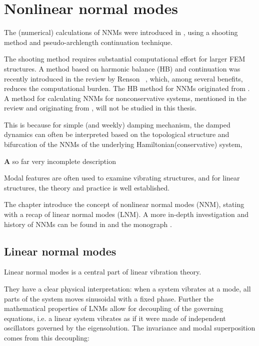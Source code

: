 
\section{Nonlinear normal modes}
\label{sec:nonl-norm-modes}

The (numerical) calculations of NNMs were introduced in
\textcite{kerschen2009b}, using a shooting method and pseudo-archlength
continuation technique.

The shooting method requires substantial computational effort for larger FEM
structures. A method based on harmonic balance (HB) and continuation was
recently introduced in the review by Renson~ \autocite{renson2016a}, which, among several
benefits, reduces the computational burden. The HB method for NNMs originated
from \textcite{detroux2016a}. A method for calculating NNMs for nonconservative
systems, mentioned in the review and originating from \textcite{renson2014_phd},
will not be studied in this thesis.

This is because for simple (and weekly) damping mechanism, the damped dynamics
can often be interpreted based on the topological structure and bifurcation of
the NNMs of the underlying Hamiltonian(conservative) system,
\autocite[sec. 4]{renson2016a}

{\textbf A so far very incomplete description}

Modal features are often used to examine vibrating structures, and for linear
structures, the theory and practice is well established.

The chapter introduce the concept of nonlinear normal modes (NNM), stating with
a recap of linear normal modes (LNM). A more in-depth investigation and history
of NNMs can be found in \autocite{kerschen2009a} and the monograph \autocite[chap
2.]{vakakis2008a}.


\subsection{Linear normal modes}
\label{sec:linear-normal-modes}


Linear normal modes is a central part of linear vibration theory.

They have a clear physical interpretation: when a system vibrates at a mode, all
parts of the system moves sinusoidal with a fixed phase.
Further the mathematical properties of LNMs allow for decoupling of the
governing equations, i.e. a linear system vibrates as if it were made of
independent oscillators governed by the eigensolution. The invariance and modal
superposition comes from this decoupling:


